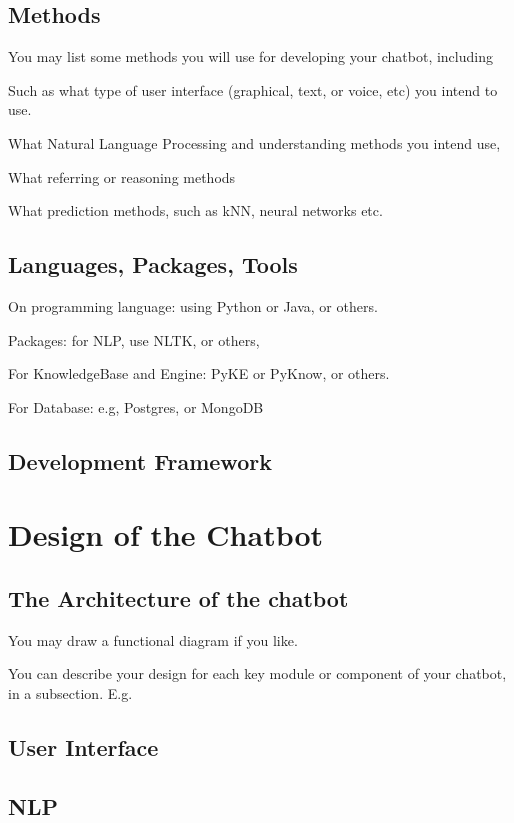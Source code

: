 \documentclass[11pt]{article}
\begin{document}
	\subsection{Methods}
	
	You may list some methods you will use for developing your chatbot, including 
	
	Such as what type of user interface (graphical, text, or voice, etc) you intend to use.
	
	What Natural Language Processing and understanding methods you intend use, 
	
	What referring or reasoning methods
	
	What prediction methods, such as kNN, neural networks etc. 
	
	\subsection{Languages, Packages, Tools}
	
	On programming language: using Python or Java, or others. 
	
	Packages: for NLP, use NLTK\citep{NLTK}, or others, 
	
	For KnowledgeBase and Engine: PyKE or PyKnow, or others. 
	
	For Database: e.g, Postgres, or MongoDB     
	
	\subsection{Development Framework}
	
	
	\section{Design of the Chatbot}	
	
	\subsection{The Architecture of the chatbot}
	You may draw a functional diagram if you like.  
	
	You can describe your design for each key module or component of your chatbot, in a subsection. E.g. 
	\subsection{User Interface} 
	
	\subsection{NLP}
	
\end{document}
